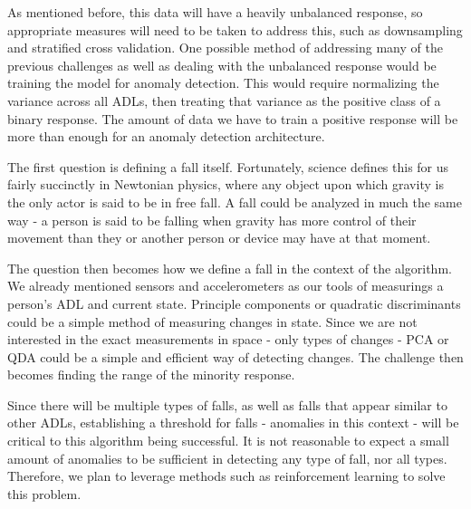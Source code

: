 \documentclass{llncs}
\begin{document}
    As mentioned before, this data will have a heavily unbalanced response, so appropriate measures will need to be taken to address this, such as downsampling and stratified cross validation. One possible method of addressing many of the previous challenges as well as dealing with the unbalanced response would be training the model for anomaly detection. This would require normalizing the variance across all ADLs, then treating that variance as the positive class of a binary response. The amount of data we have to train a positive response will be more than enough for an anomaly detection architecture.
	
	
	
	The first question is defining a fall itself. Fortunately, science defines this for us fairly succinctly in Newtonian physics, where any object upon which gravity is the only actor is said to be in free fall. A fall could be analyzed in much the same way - a person is said to be falling when gravity has more control of their movement than they or another person or device may have at that moment.
	
	The question then becomes how we define a fall in the context of the algorithm. We already mentioned sensors and accelerometers as our tools of measurings a person's ADL and current state. Principle components or quadratic discriminants could be a simple method of measuring changes in state. Since we are not interested in the exact measurements in space - only types of changes - PCA or QDA could be a simple and efficient way of detecting changes. The challenge then becomes finding the range of the minority response.
	
	Since there will be multiple types of falls, as well as falls that appear similar to other ADLs, establishing a threshold for falls - anomalies in this context - will be critical to this algorithm being successful. It is not reasonable to expect a small amount of anomalies to be sufficient in detecting any type of fall, nor all types. Therefore, we plan to leverage methods such as reinforcement learning to solve this problem.
	
\end{document}
